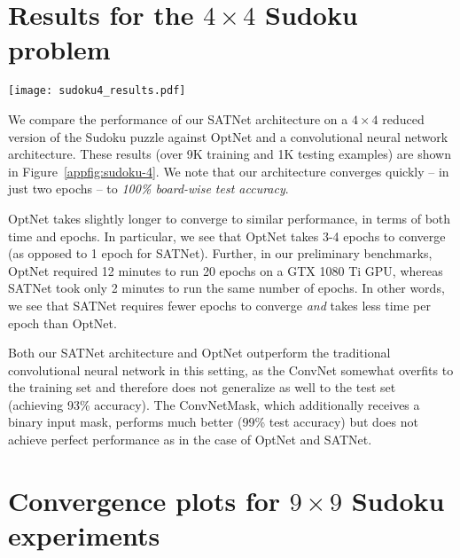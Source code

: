 \documentclass{article}
\begin{document}
	\section{Results for the $4 \times 4$ Sudoku problem}
	\label{appsec:sudoku-4}
	










    \begin{figure*}[t!]
		\centering
		
		\texttt{[image: sudoku4\_results.pdf]}
		
		\caption{Results for $4\times 4$ Sudoku. Lower loss (mean NLL loss and mean MSE loss) and higher whole-board accuracy (\% puzzles correct) are better.}
		\label{appfig:sudoku-4}
	\end{figure*}
	
	We compare the performance of our SATNet architecture on a $4 \times 4$ reduced version of the Sudoku puzzle against OptNet \cite{amos2017optnet} and a convolutional neural network architecture.
	These results (over 9K training and 1K testing examples) are shown in Figure~\ref{appfig:sudoku-4}.
	We note that our architecture converges quickly -- in just two epochs -- to \emph{100\% board-wise test accuracy}. 
	
	OptNet takes slightly longer to converge to similar performance, in terms of both time and epochs.
	In particular, we see that OptNet takes 3-4 epochs to converge (as opposed to 1 epoch for SATNet).
	Further, in our preliminary benchmarks,  OptNet required 12 minutes to run 20 epochs on a GTX 1080 Ti GPU, whereas SATNet took only 2 minutes to run the same number of epochs.
	In other words, we see that SATNet requires fewer epochs to converge \emph{and} takes less time per epoch than OptNet.
	
	Both our SATNet architecture and OptNet outperform the traditional convolutional neural network in this setting, as the ConvNet somewhat overfits to the training set and therefore does not generalize as well to the test set (achieving 93\% accuracy). 
	The ConvNetMask, which additionally receives a binary input mask, performs much better (99\% test accuracy) but does not achieve perfect performance as in the case of OptNet and SATNet.

    \section{Convergence plots for $9 \times 9$ Sudoku experiments}
	\label{appsec:sudoku-9}
    
\end{document}
